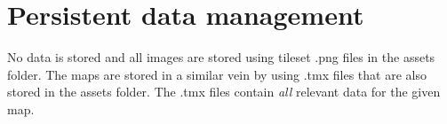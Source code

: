 \section{Persistent data management}

\begin{comment}

If your application makes use of persistent data (for example stores user
profiles etc.), then explain how you store data (and other resources such as
icons, images, audio, etc.).

\end{comment}
No data is stored and all images are stored using tileset .png files in the assets folder. The maps are stored in a similar vein by using .tmx files that are also stored in the assets folder. The .tmx files contain \emph{all} relevant data for the given map.